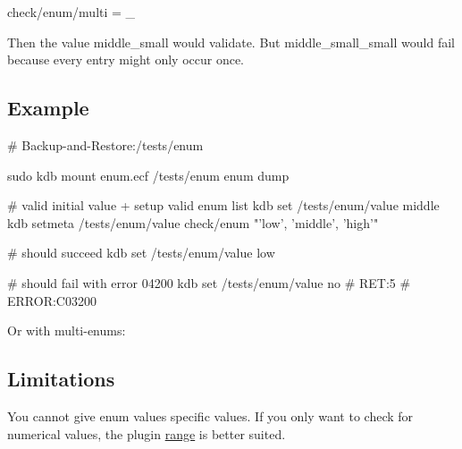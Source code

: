 \begin{DoxyCode}
check/enum/multi = \_
\end{DoxyCode}


Then the value {\ttfamily middle\+\_\+small} would validate. But {\ttfamily middle\+\_\+small\+\_\+small} would fail because every entry might only occur once.

\subsection*{Example}


\begin{DoxyCode}
# Backup-and-Restore:/tests/enum

sudo kdb mount enum.ecf /tests/enum enum dump

# valid initial value + setup valid enum list
kdb set /tests/enum/value middle
kdb setmeta /tests/enum/value check/enum "'low', 'middle', 'high'"

# should succeed
kdb set /tests/enum/value low

# should fail with error 04200
kdb set /tests/enum/value no
# RET:5
# ERROR:C03200
\end{DoxyCode}


Or with multi-\/enums\+:




\subsection*{Limitations}

You cannot give enum values specific values. If you only want to check for numerical values, the plugin \hyperlink{md_src_plugins_range_README_src_plugins_range_README_md}{range} is better suited. 